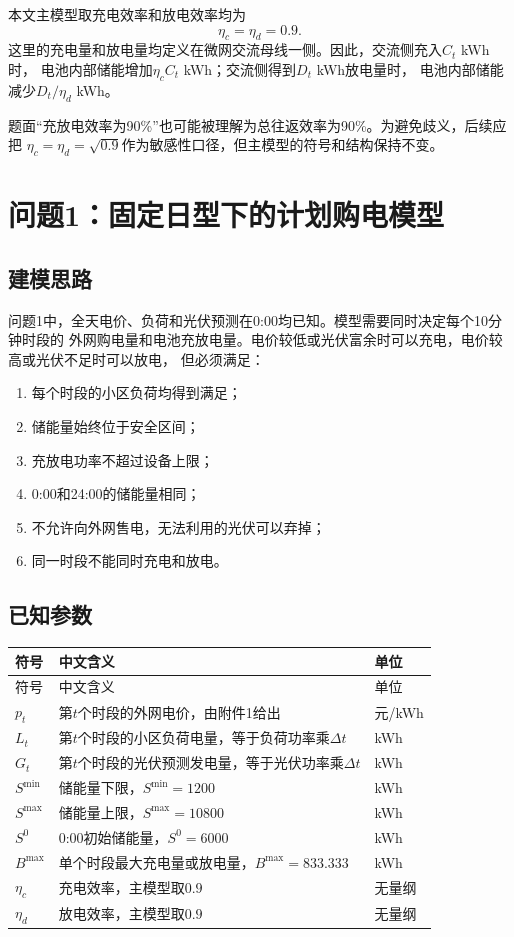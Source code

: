 \documentclass[UTF8,11pt]{ctexart}
\begin{document}
本文主模型取充电效率和放电效率均为
\begin{equation}
    \eta_c=\eta_d=0.9.
\end{equation}
这里的充电量和放电量均定义在微网交流母线一侧。因此，交流侧充入$C_t$ kWh时，
电池内部储能增加$\eta_c C_t$ kWh；交流侧得到$D_t$ kWh放电量时，
电池内部储能减少$D_t/\eta_d$ kWh。

题面“充放电效率为90\%”也可能被理解为总往返效率为90\%。为避免歧义，后续应把
$\eta_c=\eta_d=\sqrt{0.9}$作为敏感性口径，但主模型的符号和结构保持不变。

\section{问题1：固定日型下的计划购电模型}

\subsection{建模思路}

问题1中，全天电价、负荷和光伏预测在0:00均已知。模型需要同时决定每个10分钟时段的
外网购电量和电池充放电量。电价较低或光伏富余时可以充电，电价较高或光伏不足时可以放电，
但必须满足：
\begin{enumerate}[label=(\arabic*)]
    \item 每个时段的小区负荷均得到满足；
    \item 储能量始终位于安全区间；
    \item 充放电功率不超过设备上限；
    \item 0:00和24:00的储能量相同；
    \item 不允许向外网售电，无法利用的光伏可以弃掉；
    \item 同一时段不能同时充电和放电。
\end{enumerate}

\subsection{已知参数}

\begin{longtable}{>{\centering\arraybackslash}p{2.6cm}p{7.2cm}p{2.4cm}}
\toprule
符号 & 中文含义 & 单位 \\
\midrule
\endfirsthead
\toprule
符号 & 中文含义 & 单位 \\
\midrule
\endhead
$p_t$ & 第$t$个时段的外网电价，由附件1给出 & 元/kWh \\
$L_t$ & 第$t$个时段的小区负荷电量，等于负荷功率乘$\Delta t$ & kWh \\
$G_t$ & 第$t$个时段的光伏预测发电量，等于光伏功率乘$\Delta t$ & kWh \\
$S^{\min}$ & 储能量下限，$S^{\min}=1200$ & kWh \\
$S^{\max}$ & 储能量上限，$S^{\max}=10800$ & kWh \\
$S^{0}$ & 0:00初始储能量，$S^{0}=6000$ & kWh \\
$B^{\max}$ & 单个时段最大充电量或放电量，$B^{\max}=833.333$ & kWh \\
$\eta_c$ & 充电效率，主模型取$0.9$ & 无量纲 \\
$\eta_d$ & 放电效率，主模型取$0.9$ & 无量纲 \\
\bottomrule
\end{longtable}
\end{document}
